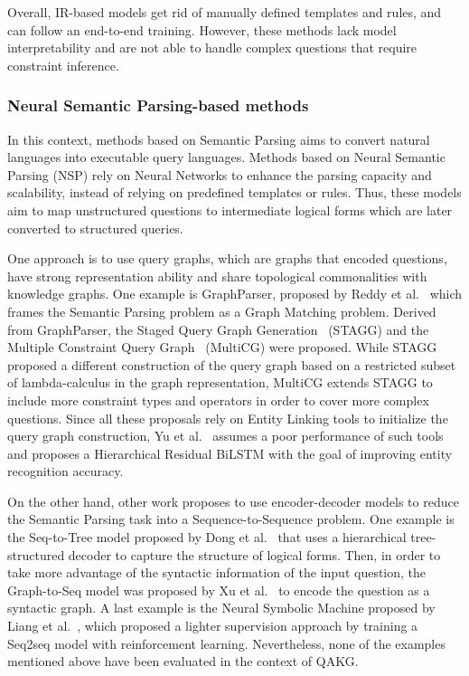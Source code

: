 Overall, IR-based models get rid of manually defined templates and rules, and can follow an 
end-to-end training. However, these methods lack model interpretability and are not able to 
handle complex questions that require constraint inference.

\subsubsection{Neural Semantic Parsing-based methods}
\label{cap2:theoFrame/qakg/approaches/neuSemParsing}
In this context, methods based on Semantic Parsing aims to convert natural languages into 
executable query languages. Methods based on Neural Semantic Parsing (NSP) rely on Neural 
Networks to enhance the parsing capacity and scalability, instead of relying on predefined 
templates or rules. Thus, these models aim to map unstructured questions to intermediate 
logical forms which are later converted to structured queries.

One approach is to use query graphs, which are graphs that encoded questions, have strong 
representation ability and share topological commonalities with knowledge graphs. One example 
is GraphParser, proposed by Reddy et al.~\cite{qa:ReddyLS14} which frames the Semantic Parsing 
problem as a Graph Matching problem. Derived from GraphParser, the Staged Query Graph 
Generation~\cite{qa:YihCHG15} (STAGG) and the Multiple Constraint Query Graph~\cite{qa:BaoDYZZ16} 
(MultiCG) were proposed. While STAGG proposed a different construction of the query graph based 
on a restricted subset of lambda-calculus in the graph representation, MultiCG extends STAGG to 
include more constraint types and operators in order to cover more complex questions. Since all 
these proposals rely on Entity Linking tools to initialize the query graph construction, 
Yu et al.~\cite{qa:YuYHSXZ17} assumes a poor performance of such tools and proposes a 
Hierarchical Residual BiLSTM with the goal of improving entity recognition accuracy.

On the other hand, other work proposes to use encoder-decoder models to reduce the Semantic 
Parsing task into a Sequence-to-Sequence problem. One example is the Seq-to-Tree model proposed 
by Dong et al.~\cite{nmt:DongL16} that uses a hierarchical tree-structured decoder to capture 
the structure of logical forms. Then, in order to take more advantage of the syntactic 
information of the input question, the Graph-to-Seq model was proposed by Xu et al.~\cite{qa:XuWWYCS18} 
to encode the question as a syntactic graph. A last example is the Neural Symbolic Machine 
proposed by Liang et al.~\cite{qa:LiangBLFL17}, which proposed a lighter supervision approach 
by training a Seq2seq model with reinforcement learning. Nevertheless, none of the examples 
mentioned above have been evaluated in the context of QAKG.

